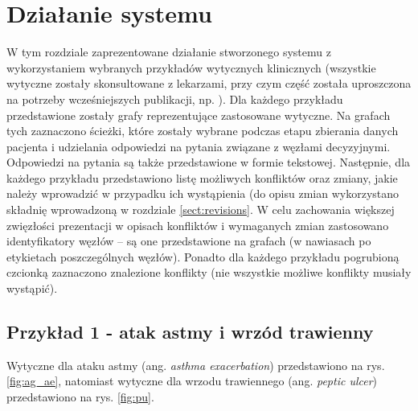 \chapter{Działanie systemu}
W tym rozdziale zaprezentowane działanie stworzonego systemu z wykorzystaniem wybranych przykładów wytycznych klinicznych (wszystkie wytyczne zostały skonsultowane z lekarzami, przy czym część została uproszczona na potrzeby wcześniejszych publikacji, np. \citep{SzWilk,SzWilk2}). Dla każdego przykładu przedstawione zostały grafy reprezentujące zastosowane wytyczne. Na grafach tych zaznaczono ścieżki, które zostały wybrane podczas etapu zbierania danych pacjenta i udzielania odpowiedzi na pytania związane z węzłami decyzyjnymi. Odpowiedzi na pytania są także przedstawione w formie tekstowej. Następnie, dla każdego przykładu przedstawiono listę możliwych konfliktów oraz zmiany, jakie należy wprowadzić w przypadku ich wystąpienia (do opisu zmian wykorzystano składnię wprowadzoną w rozdziale \ref{sect:revisions}. W celu zachowania większej zwięzłości prezentacji w opisach konfliktów i wymaganych zmian zastosowano identyfikatory węzłów -- są one przedstawione na grafach (w nawiasach po etykietach poszczególnych węzłów). Ponadto dla każdego przykładu pogrubioną czcionką zaznaczono znalezione konflikty (nie wszystkie możliwe konflikty musiały wystąpić).

\section{Przykład 1 - atak astmy i wrzód trawienny}
Wytyczne dla ataku astmy (ang. \textit{asthma exacerbation}) przedstawiono na rys. \ref{fig:ag_ae}, natomiast wytyczne dla wrzodu trawiennego (ang. \textit{peptic ulcer}) przedstawiono na rys. \ref{fig:pu}.

